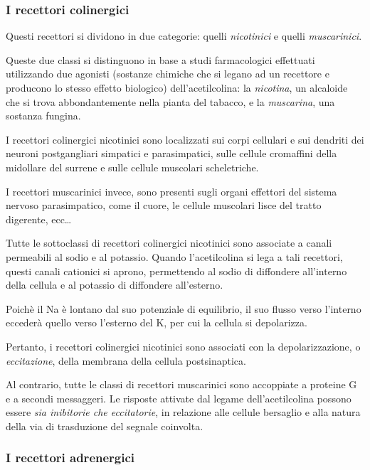 \documentclass[]{article}
\begin{document}
\subsubsection{I recettori colinergici}\label{i-recettori-colinergici}

Questi recettori si dividono in due categorie: quelli \emph{nicotinici}
e quelli \emph{muscarinici}.

Queste due classi si distinguono in base a studi farmacologici
effettuati utilizzando due agonisti (sostanze chimiche che si legano ad
un recettore e producono lo stesso effetto biologico) dell'acetilcolina:
la \emph{nicotina}, un alcaloide che si trova abbondantemente nella
pianta del tabacco, e la \emph{muscarina}, una sostanza fungina.

I recettori colinergici nicotinici sono localizzati sui corpi cellulari
e sui dendriti dei neuroni postgangliari simpatici e parasimpatici,
sulle cellule cromaffini della midollare del surrene e sulle cellule
muscolari scheletriche.

I recettori muscarinici invece, sono presenti sugli organi effettori del
sistema nervoso parasimpatico, come il cuore, le cellule muscolari lisce
del tratto digerente, ecc\ldots{}

Tutte le sottoclassi di recettori colinergici nicotinici sono associate
a canali permeabili al sodio e al potassio. Quando l'acetilcolina si
lega a tali recettori, questi canali cationici si aprono, permettendo al
sodio di diffondere all'interno della cellula e al potassio di
diffondere all'esterno.

Poichè il Na è lontano dal suo potenziale di equilibrio, il suo flusso
verso l'interno eccederà quello verso l'esterno del K, per cui la
cellula si depolarizza.

Pertanto, i recettori colinergici nicotinici sono associati con la
depolarizzazione, o \emph{eccitazione}, della membrana della cellula
postsinaptica.

Al contrario, tutte le classi di recettori muscarinici sono accoppiate a
proteine G e a secondi messaggeri. Le risposte attivate dal legame
dell'acetilcolina possono essere \emph{sia inibitorie che eccitatorie},
in relazione alle cellule bersaglio e alla natura della via di
trasduzione del segnale coinvolta.

\subsubsection{I recettori adrenergici}\label{i-recettori-adrenergici}
\end{document}
